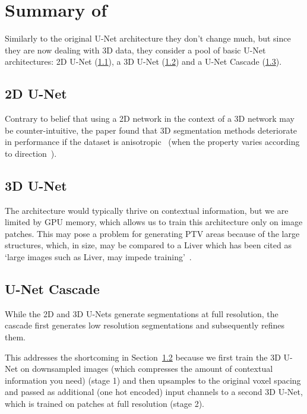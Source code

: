 \documentclass[11pt]{article}
\begin{document}


\tableofcontents

\clearpage

\section{Summary of~\cite{nnunet}}

Similarly to the original U-Net architecture they don't change much, but since they are now dealing with 3D data, they consider a pool of basic U-Net architectures: 2D U-Net (\ref{sec:2d-u-net}), a 3D U-Net (\ref{sec:3d-u-net}) and a U-Net Cascade (\ref{sec:u-net-cascade}).

\subsection{2D U-Net} \label{sec:2d-u-net}

Contrary to belief that using a 2D network in the context of a 3D network may be counter-intuitive, the paper found that 3D segmentation methods deteriorate in performance if the dataset is anisotropic~\cite{nnunet} (when the property varies according to direction~\cite{anisotropy}).

\subsection{3D U-Net}\label{sec:3d-u-net}

The architecture would typically thrive on contextual information, but we are limited by GPU memory, which allows us to train this architecture only on image patches. This may pose a problem for generating PTV areas because of the large structures, which, in size, may be compared to a Liver which has been cited as `large images such as Liver, may impede training'~\cite{nnunet}.

\subsection{U-Net Cascade} \label{sec:u-net-cascade}

While the 2D and 3D U-Nets generate segmentations at full resolution, the cascade first generates low resolution segmentations and subsequently refines them.

This addresses the shortcoming in Section~\ref{sec:3d-u-net} because we first train the 3D U-Net on downsampled images (which compresses the amount of contextual information you need) (stage 1) and then upsamples to the original voxel spacing and passed as additional (one hot encoded) input channels to a second 3D U-Net, which is trained on patches at full resolution (stage 2).
\end{document}
